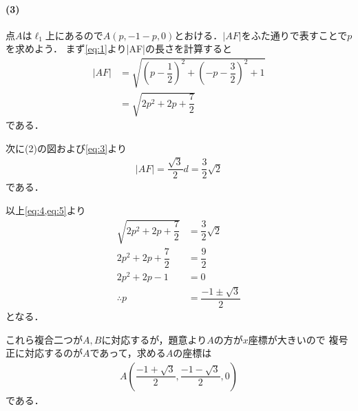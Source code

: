 \documentclass[../../main.tex]{subfiles}
\begin{document}
\paragraph{(3)}

点$A$は$\ell_1$上にあるので$A(p,-1-p,0)$とおける．$|AF|$をふた通りで表すことで$p$を求めよう．
まず\cref{eq:1}より|AF|の長さを計算すると
\begin{align}
  |AF|
  &=\sqrt{\left(p-\dfrac{1}{2}\right)^2+\left(-p-\dfrac{3}{2}\right)^2+1} \\
  &=\sqrt{2p^2+2p+\dfrac{7}{2}} \label{eq:4}
\end{align}
である．

次に(2)の図および\cref{eq:3}より
\begin{align}
  |AF|=\dfrac{\sqrt{3}}{2}d=\dfrac{3}{2}\sqrt{2} \label{eq:5}
\end{align}
である．

以上\cref{eq:4,eq:5}より
\begin{align}
  \sqrt{2p^2+2p+\dfrac{7}{2}} &= \dfrac{3}{2}\sqrt{2} \\
  2p^2+2p+\dfrac{7}{2}        &= \dfrac{9}{2} \\
  2p^2+2p-1 &= 0 \\
  \therefore
  p &= \dfrac{-1\pm\sqrt{3}}{2}
\end{align}
となる．

これら複合二つが$A,B$に対応するが，題意より$A$の方が$x$座標が大きいので
複号正に対応するのが$A$であって，求める$A$の座標は
\begin{align}
  A\left(\dfrac{-1+\sqrt{3}}{2},\dfrac{-1-\sqrt{3}}{2},0\right)
\end{align}
である．

\newpage
\end{document}
